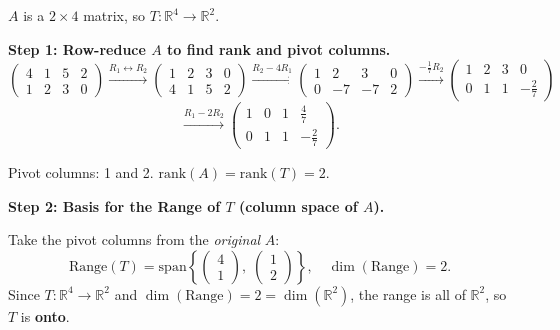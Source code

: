 \documentclass[12pt,a3paper]{article}
\begin{document}
\begin{tcolorbox}[enhanced,breakable,
  colback=cF!4,colframe=cF,boxrule=0.8pt,arc=5pt,
  title={\textbf{Answer --- $T$ = Multiplication by $A=\begin{pmatrix}4&1&5&2\\1&2&3&0\end{pmatrix}$; Range, Kernel, Rank, Nullity}},
  fonttitle=\bfseries\color{white},colbacktitle=cF]

$A$ is a $2\times4$ matrix, so $T:\mathbb{R}^4\to\mathbb{R}^2$.

\textbf{Step 1: Row-reduce $A$ to find rank and pivot columns.}
\[
\begin{pmatrix}4&1&5&2\\1&2&3&0\end{pmatrix}
\xrightarrow{R_1\leftrightarrow R_2}
\begin{pmatrix}1&2&3&0\\4&1&5&2\end{pmatrix}
\xrightarrow{R_2-4R_1}
\begin{pmatrix}1&2&3&0\\0&-7&-7&2\end{pmatrix}
\xrightarrow{-\frac{1}{7}R_2}
\begin{pmatrix}1&2&3&0\\0&1&1&-\frac{2}{7}\end{pmatrix}
\]
\[
\xrightarrow{R_1-2R_2}
\begin{pmatrix}1&0&1&\frac{4}{7}\\0&1&1&-\frac{2}{7}\end{pmatrix}.
\]


Pivot columns: 1 and 2. $\mathrm{rank}(A)=\mathrm{rank}(T)=2$.

\medskip\textbf{Step 2: Basis for the Range of $T$ (column space of $A$).}

Take the pivot columns from the \emph{original} $A$:
\[
\boxed{\mathrm{Range}(T)=\mathrm{span}\!\left\{\begin{pmatrix}4\\1\end{pmatrix},\;\begin{pmatrix}1\\2\end{pmatrix}\right\},\quad\dim(\mathrm{Range})=2.}
\]
Since $T:\mathbb{R}^4\to\mathbb{R}^2$ and $\dim(\mathrm{Range})=2=\dim(\mathbb{R}^2)$, the range is all of $\mathbb{R}^2$, so $T$ is \textbf{onto}.


\end{tcolorbox}
\end{document}
